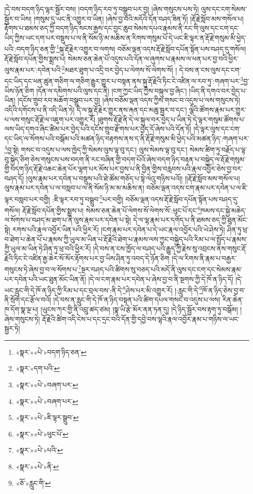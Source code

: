 །དེ་བས་བདག་ཉིད་ལྷར་སྦྱོར་བས། །བདག་ཉིད་རབ་ཏུ་བསྒྲུབ་པར་བྱ། །ཞེས་གསུངས་པས་ཏེ། ལུས་དང་ངག་སེམས་སྦྱོར་བ་ཡིས། །གསུམ་དུ་ཡང་ནི་འགྱུར་བ་ཡིན། །ཞེས་བྱ་བའི་མདོའི་དོན་བཤད་ཟིན་ཏོ། །རྡོ་རྗེ་སློབ་མས་གསོལ་པ། རྟོགས་པ་ཐམས་ཅད་ཀྱི་བདག་ཉིད་སངས་རྒྱས་དང་བྱང་ཆུབ་སེམས་དཔའ་རྣམས་ནི་རང་གི་ལུས་དང་ངག་དང་ཡིད་ཀྱིས་ཡང་དག་པར་བསྡུས་པ་ལ་ནི་སོམ་ཉི་མ་མཆིས་ན་རིགས་གསུམ་པོ་དེ་ཡང་ཇི་ལྟར་ན་རྡོ་རྗེ་གསུམ་མི་ཕྱེད་པའི་:བདག་ཉིད་ཅན་གྱི་\footnote{«སྣར་»«པེ་»བདག་ཉིད་ཅན་}སྐུ་རྡོ་རྗེར་འགྱུར་བ་ལགས། བཅོམ་ལྡན་འདས་རྡོ་རྗེ་སློབ་དཔོན་སྟོན་པས་བཤད་དུ་གསོལ། རྡོ་རྗེ་སློབ་དཔོན་གྱིས་སྨྲས་པ། སེམས་ཅན་ཆེན་པོ་འདུས་པའི་དོན་ལ་ཞུགས་པ་རྣམས་ལ་ཕན་པར་བྱ་བའི་ཕྱིར་ལུས་རྣམ་པར་:དབེན་པའི་\footnote{«སྣར་»དག་པའི་}མཐར་ཐུག་པ་འདྲི་བར་བྱེད་པ་ལེགས་སོ་ལེགས་སོ། །
དེ་བས་ན་ངས་ལུས་དང་ངག་དང་ཡིད་དང་ཕན་ཚུན་གཅིག་ལ་གཅིག་རྒྱུར་གྱུར་པ་བསྟན་ནས་སྐུ་རྡོ་རྗེའི་ཏིང་ངེ་འཛིན་ལ་རབ་ཏུ་:གཞག་པར་\footnote{«སྣར་»«པེ་»བཞག་པར་}བྱ་ཡིས་ཉོན་ཅིག །དོན་ལ་དམིགས་པའི་ལུས་དང་ནི། །ངག་ཀྱང་ཡིད་ཀྱིས་བསྐུལ་བྱ་ཞིང་། །ཡིད་ནི་དགའ་བར་བྱེད་པ་ཡིན། །དངོས་གྲུབ་རབ་མཆོག་བསྒྲུབ་པར་བྱ། །ཞེས་བཅོམ་ལྡན་འདས་ཀྱིས་གསང་བ་འདུས་པ་ལས་གསུངས་ཏེ། འདིའི་དགོངས་པ་ནི་འདི་ཡིན་ཏེ། དེ་ལ་སྐུ་རྡོ་རྗེར་གྱུར་ནས་རྐན་དང་མཆུ་སྦྱར་བ་དང་། ལྕེའི་ཚོགས་རྣམ་པར་གྱུར་པ་ལས་གསུང་རྡོ་རྗེ་ལ་འཇུག་པར་འགྱུར་རོ། །ཐུགས་རྡོ་རྗེ་ནི་དེ་ལ་སྐུལ་བར་བྱེད་པ་ཡིན་ཏེ་དེ་ལྟར་གསུམ་ཚོགས་པ་ལས་ཡིད་དགའ་ཞིང་ཚིམ་པར་བྱེད་པའི་དངོས་གྲུབ་རྫོགས་པར་བྱེད་དོ་ཞེས་པའི་དོན་ཏོ། །དེ་ལྟར་ལུས་དང་ངག་དང་ཡིད་ལ་སོགས་པའི་བསྒོམ་པའི་མཚན་ཉིད་བརྟགས་ནས་ད་ནི་རྡོ་རྗེ་གསུམ་མི་ཕྱེད་པའི་མཚན་ཉིད་:གཞག་པར་\footnote{«སྣར་»«པེ་»བཞག་པར་}བྱ་སྟེ། གསང་བ་འདུས་པ་ལས་ཁྱེད་ཀྱི་སེམས་ལུས་ལྟ་བུ་དང་། ལུས་སེམས་ལྟ་བུ་དང་། སེམས་ཚིག་ཏུ་བརྗོད་པ་ལྟ་བུ་སྐྱེད་ཅིག་ཅེས་གསུངས་པས་བདག་ནི་རང་བཞིན་གྱི་བདག་པོའོ་ཞེས་བདག་ཉིད་བརྟན་པ་བསྐྱེད་ལ་རྡོ་རྗེ་གསུམ་གྱི་བདག་ཉིད་རྡོ་རྗེ་འཆང་ཆེན་པོར་ལྷག་པར་མོས་པར་བྱས་པ་ནི་བྱིན་གྱིས་བརླབས་པའི་རྣལ་འབྱོར་ཅེས་བྱ་བར་བཤད་དོ། །ལུས་རྣམ་པར་དབེན་པ་བསྡུས་པའི་ཐེ་ཚོམ་གཅོད་པ་སྟེ་ལེའུ་གཉིས་པའོ།། །།རྡོ་རྗེ་སློབ་མས་གསོལ་པ། ལུས་རྣམ་པར་དབེན་པ་ལ་བསླབ་པ་ལ་ནི་སོམ་ཉི་མ་མ་མཆིས་ན། བཅོམ་ལྡན་འདས་ངག་རྣམ་པར་དབེན་པ་ལ་ཇི་ལྟར་བསླབ་པར་བགྱི། :ཇི་ལྟར་རབ་ཏུ་བསྒྲུབ་\footnote{«སྣར་»«པེ་»ཇི་ལྟར་སྒྲུབ་}པར་བགྱི། བཅོམ་ལྡན་འདས་རྡོ་རྗེ་སློབ་དཔོན་སྟོན་པས་བཤད་དུ་གསོལ། རྡོ་རྗེ་སློབ་དཔོན་གྱིས་སྨྲས་པ། སེམས་ཅན་ཆེན་པོ་ལེགས་སོ་ལེགས་སོ་:ཕུང་པོ་དང་\footnote{«སྣར་»«པེ་»ཕུང་པོ་}ཁམས་དང་སྐྱེ་མཆེད་ལ་སོགས་པ་བཤད་མ་ཐག་པ་ནི་ལུས་རྣམ་པར་དབེན་པ་སྟེ། དེ་ལ་ལྷ་རྣམ་པར་དགོད་པ་ནི་ཐམས་ཅད་ཀྱི་ཐུན་མོང་སྟེ། རགས་པའི་རྣལ་འབྱོར་ཡིན་པའི་ཕྱིར་རོ། །ངག་རྣམ་པར་དབེན་པ་དེ་ཡང་རྣལ་འབྱོར་པའི་ཡེ་ཤེས་ཏེ། ཤིན་ཏུ་ཕྲ་བ་ཐེག་པ་ཆེན་པོ་པ་རྣམས་ཀྱི་ཡུལ་མ་ཡིན་པ་རྡོ་རྗེའི་ཐེག་པ་རྣམས་ལས་ཀྱང་བསྐྱེད་པའི་རིམ་པ་ལ་སྤྱོད་པ་རྣམས་ཀྱི་ཡུལ་མ་ཡིན་ཏེ་ཤིན་ཏུ་ཕྲ་བའི་ཕྱིར་རོ། །དེ་བས་ན་ངས་ཁྱོད་ལ་བཤད་པའི་རྒྱུད་ཀྱི་རྗེས་སུ་འབྲངས་ནས་གསུང་རྡོ་རྗེའི་ཏིང་ངེ་འཛིན་རྒྱ་ཆེར་སོ་སོར་རྟོགས་པར་བྱ་ཡིས་ཤིན་ཏུ་འབད་དེ་ཉོན་ཅིག །དེ་ལ་རིགས་ནི་རྣམ་པ་བརྒྱར་གསུངས་ཏེ་ཞེས་བྱ་བ་ལ་སོགས་པ་\footnote{«སྣར་»«པེ་»པའི་}སྔར་བཤད་པའི་ཚིགས་སུ་བཅད་པའི་མདོ་ནི་ལུས་དང་ངག་དང་སེམས་རྣམ་པར་དབེན་པའི་ཡང་ཐུན་མོང་ཡིན་ནོ། །དེ་ལ་ངག་རྣམ་པར་དབེན་པ་ཞེས་བྱ་བ་ནི་སྔགས་ཀྱི་དེ་ཁོ་ན་ཉིད་དོ། །དེ་ཡང་རླུང་གི་དེ་ཁོ་ན་ཉིད་ཀྱི་རིམ་པ་དང་བྲལ་བས་:ནི་དེ་\footnote{«སྣར་»«པེ་»ནི་}ཤེས་པར་མི་འགྱུར་རོ། །:རླུང་གི་དེ་\footnote{«ཅོ་»རླུང་གི་}ཁོ་ན་ཉིད་ཅེས་བྱ་བ་ནི་སྲོག་དང་རྩོལ་བའོ། །དེ་བས་ན་རླུང་གི་དེ་ཁོ་ན་ཉིད་བསྟན་པའི་ཚིག་དཔལ་གསང་བ་འདུས་པ་ལས། རིན་ཆེན་ཁ་དོག་སྣ་ལྔ་པ། །ཡུངས་ཀར་གྱི་ནི་འབྲུ་ཚད་ཙམ། །སྣ་ཡི་རྩེ་མོར་ནན་ཏན་དུ། །དེ་ཉིད་སྦྱོར་བས་རྟག་ཏུ་བསྒོམ། །ཞེས་གསུངས་ཏེ། རྡོ་རྗེའི་ཚིག་འདི་ངེས་པ་དང་དྲང་བའི་དོན་གྱི་དབྱེ་བས་ལྷའི་རྣལ་འབྱོར་རྣམ་པ་གཉིས་ལ་ཡང་སྦྱར་ཏེ། 